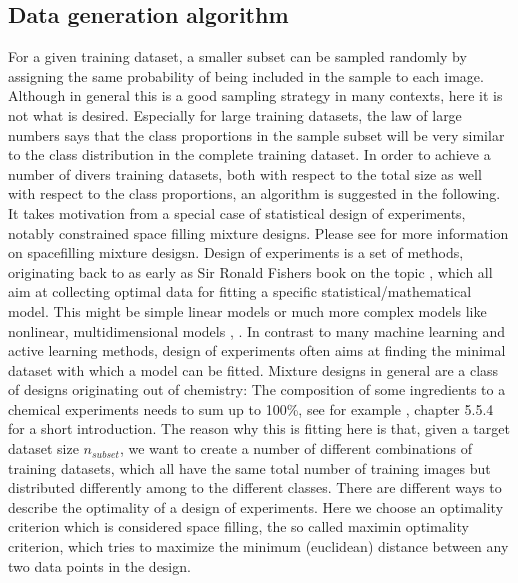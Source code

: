 \documentclass{article} %
\begin{document}
\subsection{Data generation algorithm}




For a given training dataset, a smaller subset can be sampled randomly by assigning the same probability of being included in the sample to each image.
Although in general this is a good sampling strategy in many contexts, here it is not what is desired.
Especially for large training datasets, the law of large numbers says that the class proportions in the sample subset will be very similar to the class distribution in the complete training dataset.
In order to achieve a number of divers training datasets, both with respect to the total size as well with respect to the class proportions, an algorithm is suggested in the following.
It takes motivation from a special case of statistical design of experiments, notably constrained space filling mixture designs. Please see \cite{gomes_hal_spacefilling_mixtures} for more information on spacefilling mixture desigsn.
Design of experiments is a set of methods, originating back to as early as Sir Ronald Fishers book on the topic \cite{fisher_1935}, which all aim at collecting optimal data for fitting a specific statistical/mathematical model. This might be simple linear models or much more complex
models like nonlinear, multidimensional models \cite{myers2009response}, \cite{Goos_Jones_optDoE_2011}. In contrast to many machine learning and active learning methods, design of experiments
often aims at finding the minimal dataset with which a model can be fitted.
Mixture designs in general are a class of designs originating out of chemistry: The composition of some ingredients to a chemical experiments needs to sum up to 100\%, see for example \cite{Nist_2012_eng_stats}, chapter 5.5.4 for a short introduction.
The reason why this is fitting here is that, given a target dataset size $n_{subset}$, we want to create a number of different combinations of training datasets, which all have the same total number of training images but distributed differently among to the different classes.
There are different ways to describe the optimality of a design of experiments. Here we choose an optimality criterion which is considered space filling, the so called maximin optimality criterion, which tries to maximize the minimum (euclidean) distance between any two data points in the design.
\end{document}
